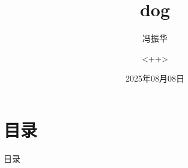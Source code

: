 \documentclass[a4paper,fontset = windows,aspectratio=169,9pt ]{ctexbeamer}
\title{dog}
\author{冯振华\inst{1} \and <++>\inst{1}}
\institute[BNU]%
{
    \inst{1} 北京师范大学，物理与天文学院
}
\date{2025年08月08日}
\begin{document}
\frame{\titlepage}

\section{目录}
\begin{frame}{目录}
    \begin{columns}[t]
        \begin{column}{.48\textwidth}
            \tableofcontents[sections={1-4}] %
        \end{column}
        \begin{column}{.48\textwidth}
            \tableofcontents[sections={5-8}] %
        \end{column}
    \end{columns}
\end{frame}
\end{document}
